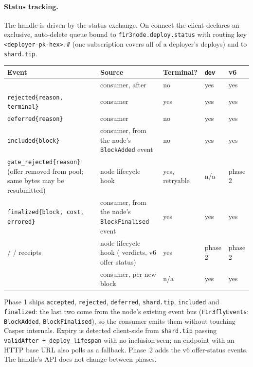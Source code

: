 \documentclass[11pt]{article}
\newcommand{\code}[1]{\texttt{#1}}
\newcommand{\dev}{\code{dev}}
\begin{document}
\paragraph{Status tracking.} The handle is driven by the status exchange. On connect
the client declares an exclusive, auto-delete queue bound to
\code{f1r3node.deploy.status} with routing key \code{<deployer-pk-hex>.\#} (one
subscription covers all of a deployer's deploys) and to \code{shard.tip}.
\begin{center}\small
\begin{tabularx}{\textwidth}{X L{3.1cm} L{1.8cm} L{1.3cm} L{1.4cm}}
\toprule
Event & Source & Terminal? & \dev & v6 \\
\midrule
{} & consumer, after  & no & yes & yes \\
\code{rejected\{reason, terminal\}} & consumer & yes & yes & yes \\
\code{deferred\{reason\}} & consumer & no & yes & yes \\
\code{included\{block\}} & consumer, from the node's \code{BlockAdded} event & no & yes & yes \\
\code{gate\_rejected\{reason\}} (offer removed from pool; same bytes may be resubmitted) & node lifecycle hook & yes, retryable & n/a & phase 2 \\
\code{finalized\{block, cost, errored\}} & consumer, from the node's \code{BlockFinalised} event & yes & yes & yes \\
 /  / receipts & node lifecycle hook ( verdicts, v6 offer status) & yes & phase 2 & phase 2 \\
 & consumer, per new block & n/a & yes & yes \\
\bottomrule
\end{tabularx}
\end{center}
Phase 1 ships \code{accepted}, \code{rejected}, \code{deferred}, \code{shard.tip},
\code{included} and \code{finalized}: the last two come from the node's existing
event bus (\code{F1r3flyEvents}: \code{BlockAdded}, \code{BlockFinalised}), so the
consumer emits them without touching Casper internals. Expiry is detected client-side
from \code{shard.tip} passing \code{validAfter + deploy\_lifespan} with no inclusion
seen; an endpoint with an HTTP base URL also polls
 as a fallback. Phase~2 adds the v6
offer-status events. The handle's API does not change between phases.
\end{document}
